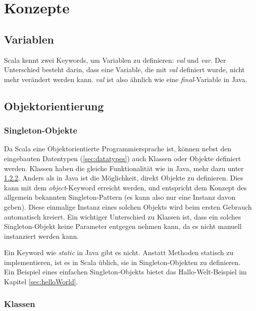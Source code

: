 \chapter{Konzepte}

\section{Variablen}

Scala kennt zwei Keywords, um Variablen zu definieren: \emph{val} und 
\emph{var}. Der Unterschied besteht darin, dass eine Variable, die mit
\emph{val} definiert wurde, nicht mehr verändert werden kann. \emph{val}
ist also ähnlich wie eine \emph{final}-Variable in Java.

\section{Objektorientierung}

\subsection{Singleton-Objekte}
\label{sec:singleton}

Da Scala eine Objektorientierte Programmiersprache ist, können nebst
den eingebauten Datentypen (\ref{sec:datatypes}) auch Klassen oder
Objekte definiert werden. Klassen haben die gleiche Funktionalität
wie in Java, mehr dazu unter \ref{sec:classes}.  Anders als in Java
ist die Möglichkeit, direkt Objekte zu definieren.  Dies kann mit dem
\emph{object}-Keyword erreicht werden, und entspricht dem Konzept des
allgemein bekannten Singleton-Pattern (es kann also nur eine Instanz davon
geben). Diese einmalige Instanz eines solchen Objekts wird beim ersten
Gebrauch automatisch kreiert. Ein wichtiger Unterschied zu Klassen ist,
dass ein solches Singleton-Objekt keine Parameter entgegen nehmen kann,
da es nicht manuell instanziert werden kann.

Ein Keyword wie \emph{static} in Java gibt es nicht. Anstatt
Methoden statisch zu implementieren, ist es in Scala üblich, sie in
Singleton-Objekten zu definieren.\\

Ein Beispiel eines einfachen Singleton-Objekts bietet das
Hallo-Welt-Beispiel im Kapitel \ref{sec:helloWorld}.

\subsection{Klassen}
\label{sec:classes}

